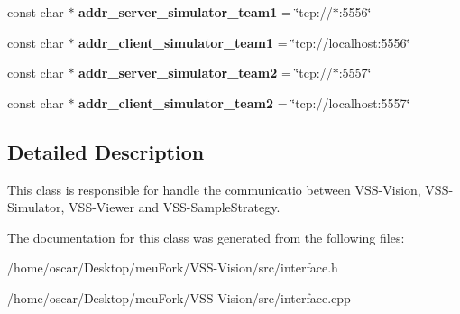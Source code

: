 \begin{DoxyCompactItemize}
\item 
\hypertarget{classInterface_a4315a24cd5d7156ccb6da180cc5a825e}{const char $\ast$ {\bfseries addr\-\_\-server\-\_\-simulator\-\_\-team1} = \char`\"{}tcp\-://$\ast$\-:5556\char`\"{}}\label{classInterface_a4315a24cd5d7156ccb6da180cc5a825e}

\item 
\hypertarget{classInterface_aa05d667c54fc41c5dc6fe7aa8a85ef5d}{const char $\ast$ {\bfseries addr\-\_\-client\-\_\-simulator\-\_\-team1} = \char`\"{}tcp\-://localhost\-:5556\char`\"{}}\label{classInterface_aa05d667c54fc41c5dc6fe7aa8a85ef5d}

\item 
\hypertarget{classInterface_ae358e6d8cb691934a5dc23c4a718082b}{const char $\ast$ {\bfseries addr\-\_\-server\-\_\-simulator\-\_\-team2} = \char`\"{}tcp\-://$\ast$\-:5557\char`\"{}}\label{classInterface_ae358e6d8cb691934a5dc23c4a718082b}

\item 
\hypertarget{classInterface_adad17a36b3382235441861a3648bd807}{const char $\ast$ {\bfseries addr\-\_\-client\-\_\-simulator\-\_\-team2} = \char`\"{}tcp\-://localhost\-:5557\char`\"{}}\label{classInterface_adad17a36b3382235441861a3648bd807}

\end{DoxyCompactItemize}


\subsection{Detailed Description}
This class is responsible for handle the communicatio between V\-S\-S-\/\-Vision, V\-S\-S-\/\-Simulator, V\-S\-S-\/\-Viewer and V\-S\-S-\/\-Sample\-Strategy. 

The documentation for this class was generated from the following files\-:\begin{DoxyCompactItemize}
\item 
/home/oscar/\-Desktop/meu\-Fork/\-V\-S\-S-\/\-Vision/src/interface.\-h\item 
/home/oscar/\-Desktop/meu\-Fork/\-V\-S\-S-\/\-Vision/src/interface.\-cpp\end{DoxyCompactItemize}
